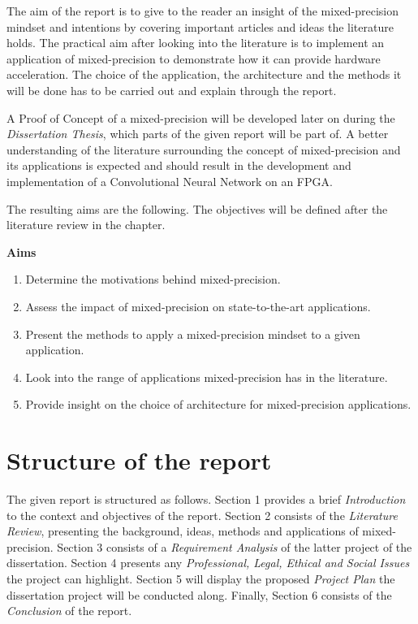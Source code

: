 The aim of the report is to give to the reader an insight of the mixed-precision mindset and intentions by covering important articles and ideas the literature holds. The practical aim after looking into the literature is to implement an application of mixed-precision to demonstrate how it can provide hardware acceleration. The choice of the application, the architecture and the methods it will be done has to be carried out and explain through the report.

A Proof of Concept of a mixed-precision will be developed later on during the \emph{Dissertation Thesis}, which parts of the given report will be part of. A better understanding of the literature surrounding the concept of mixed-precision and its applications is expected and should result in the development and implementation of a Convolutional Neural Network on an FPGA.

The resulting aims are the following. The objectives will be defined after the literature review in the  chapter.

\textbf{Aims}
\begin{enumerate}
  \item Determine the motivations behind mixed-precision.
  \item Assess the impact of mixed-precision on state-to-the-art applications.
  \item Present the methods to apply a mixed-precision mindset to a given application.
  \item Look into the range of applications mixed-precision has in the literature.
  \item Provide insight on the choice of architecture for mixed-precision applications.
\end{enumerate}


\section{Structure of the report}

The given report is structured as follows. Section 1 provides a brief \emph{Introduction} to the context and objectives of the report. Section 2 consists of the \emph{Literature Review}, presenting the background, ideas, methods and applications of mixed-precision. Section 3 consists of a \emph{Requirement Analysis} of the latter project of the dissertation. Section 4 presents any \emph{Professional, Legal, Ethical and Social Issues} the project can highlight. Section 5 will display the proposed \emph{Project Plan} the dissertation project will be conducted along. Finally, Section 6 consists of the \emph{Conclusion} of the report.
